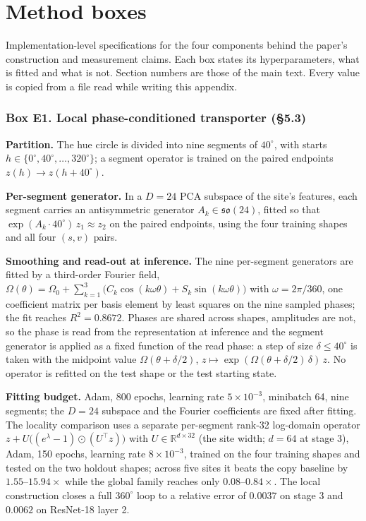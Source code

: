 \section{Method boxes}

Implementation-level specifications for the four components behind the paper's construction and measurement claims. Each box states its hyperparameters, what is fitted and what is not. Section numbers are those of the main text. Every value is copied from a file read while writing this appendix.

\subsubsection*{Box E1. Local phase-conditioned transporter (\S{}5.3)}

\textbf{Partition.} The hue circle is divided into nine segments of $40^\circ$, with starts $h\in\{0^\circ,40^\circ,\dots,320^\circ\}$; a segment operator is trained on the paired endpoints $z(h)\to z(h+40^\circ)$.

\textbf{Per-segment generator.} In a $D=24$ PCA subspace of the site's features, each segment carries an antisymmetric generator $A_k\in\mathfrak{so}(24)$, fitted so that $\exp(A_k\cdot40^\circ)\,z_1\approx z_2$ on the paired endpoints, using the four training shapes and all four $(s,v)$ pairs.

\textbf{Smoothing and read-out at inference.} The nine per-segment generators are fitted by a third-order Fourier field, $\Omega(\theta)=\Omega_0+\sum_{k=1}^{3}\big(C_k\cos(k\omega\theta)+S_k\sin(k\omega\theta)\big)$ with $\omega=2\pi/360$, one coefficient matrix per basis element by least squares on the nine sampled phases; the fit reaches $R^2=0.8672$. Phases are shared across shapes, amplitudes are not, so the phase is read from the representation at inference and the segment generator is applied as a fixed function of the read phase: a step of size $\delta\le40^\circ$ is taken with the midpoint value $\Omega(\theta+\delta/2)$, $z\mapsto\exp(\Omega(\theta+\delta/2)\,\delta)\,z$. No operator is refitted on the test shape or the test starting state.

\textbf{Fitting budget.} Adam, 800 epochs, learning rate $5\times10^{-3}$, minibatch 64, nine segments; the $D=24$ subspace and the Fourier coefficients are fixed after fitting. The locality comparison uses a separate per-segment rank-32 log-domain operator $z+U\big((e^{\lambda}-1)\odot(U^{\top}z)\big)$ with $U\in\mathbb{R}^{d\times32}$ (the site width; $d=64$ at stage 3), Adam, 150 epochs, learning rate $8\times10^{-3}$, trained on the four training shapes and tested on the two holdout shapes; across five sites it beats the copy baseline by $1.55$--$15.94\times$ while the global family reaches only $0.08$--$0.84\times$. The local construction closes a full $360^\circ$ loop to a relative error of $0.0037$ on stage 3 and $0.0062$ on ResNet-18 layer 2.

